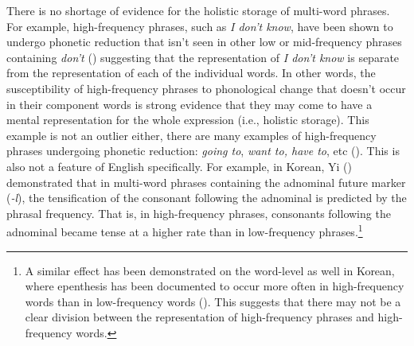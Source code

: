 \documentclass[
  12pt,
  letterpaper,
]{scrreport}
\begin{document}
There is no shortage of evidence for the holistic storage of multi-word
phrases. For example, high-frequency phrases, such as \emph{I don't
know}, have been shown to undergo phonetic reduction that isn't seen in
other low or mid-frequency phrases containing \emph{don't}
()
suggesting that the representation of \emph{I don't know} is separate
from the representation of each of the individual words. In other words,
the susceptibility of high-frequency phrases to phonological change that
doesn't occur in their component words is strong evidence that they may
come to have a mental representation for the whole expression (i.e.,
holistic storage). This example is not an outlier either, there are many
examples of high-frequency phrases undergoing phonetic reduction:
\emph{going to}, \emph{want to, have to}, etc
(). This is also not a feature of
English specifically. For example, in Korean, Yi
() demonstrated that in multi-word
phrases containing the adnominal future marker (\emph{-l}), the
tensification of the consonant following the adnominal is predicted by
the phrasal frequency. That is, in high-frequency phrases, consonants
following the adnominal became tense at a higher rate than in
low-frequency phrases.\footnote{A similar effect has been demonstrated
  on the word-level as well in Korean, where epenthesis has been
  documented to occur more often in high-frequency words than in
  low-frequency words
  (). This suggests that there may not be a clear
  division between the representation of high-frequency phrases and
  high-frequency words.}
\end{document}
